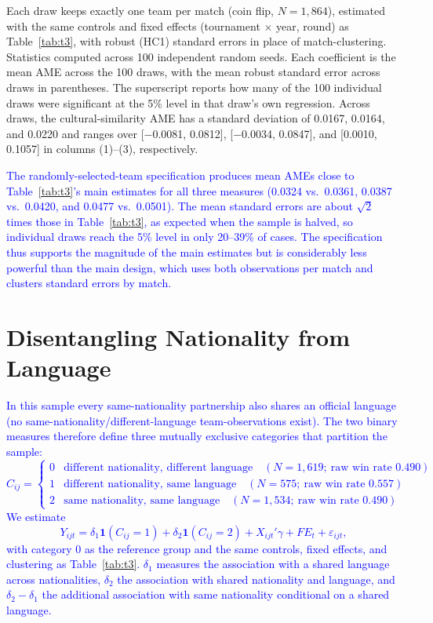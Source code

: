 \documentclass[10pt]{article}
\begin{document}
\begin{table}[htbp]
\begin{threeparttable}
\begin{tablenotes}
\small
\item Each draw keeps exactly one team per match (coin flip, $N=1{,}864$), estimated with the same controls and fixed effects (tournament $\times$ year, round) as Table~\ref{tab:t3}, with robust (HC1) standard errors in place of match-clustering. Statistics computed across 100 independent random seeds. Each coefficient is the mean AME across the 100 draws, with the mean robust standard error across draws in parentheses. The superscript reports how many of the 100 individual draws were significant at the 5\% level in that draw's own regression. Across draws, the cultural-similarity AME has a standard deviation of 0.0167, 0.0164, and 0.0220 and ranges over [$-$0.0081, 0.0812], [$-$0.0034, 0.0847], and [0.0010, 0.1057] in columns (1)--(3), respectively.
\end{tablenotes}
\end{threeparttable}
\end{table}
\FloatBarrier

\textcolor{blue}{The randomly-selected-team specification produces mean AMEs close to Table~\ref{tab:t3}'s main estimates for all three measures (0.0324 vs.\ 0.0361, 0.0387 vs.\ 0.0420, and 0.0477 vs.\ 0.0501). The mean standard errors are about $\sqrt{2}$ times those in Table~\ref{tab:t3}, as expected when the sample is halved, so individual draws reach the 5\% level in only 20--39\% of cases. The specification thus supports the magnitude of the main estimates but is considerably less powerful than the main design, which uses both observations per match and clusters standard errors by match.\\}

\section{Disentangling Nationality from Language}
\label{app:natlang}

\textcolor{blue}{In this sample every same-nationality partnership also shares an official language (no same-nationality/different-language team-observations exist). The two binary measures therefore define three mutually exclusive categories that partition the sample:
\[
C_{ij}=\begin{cases}
0 & \text{different nationality, different language} \quad (N=1{,}619;\ \text{raw win rate } 0.490)\\
1 & \text{different nationality, same language} \quad (N=575;\ \text{raw win rate } 0.557)\\
2 & \text{same nationality, same language} \quad (N=1{,}534;\ \text{raw win rate } 0.490)
\end{cases}
\]
 We estimate
\[
Y_{ijt}=\delta_1\mathbf{1}(C_{ij}=1)+\delta_2\mathbf{1}(C_{ij}=2)+X_{ijt}'\gamma+FE_t+\varepsilon_{ijt},
\]
with category 0 as the reference group and the same controls, fixed effects, and clustering as Table~\ref{tab:t3}. $\delta_1$ measures the association with a shared language across nationalities, $\delta_2$ the association with shared nationality and language, and $\delta_2-\delta_1$ the additional association with same nationality conditional on a shared language.}
\end{document}
